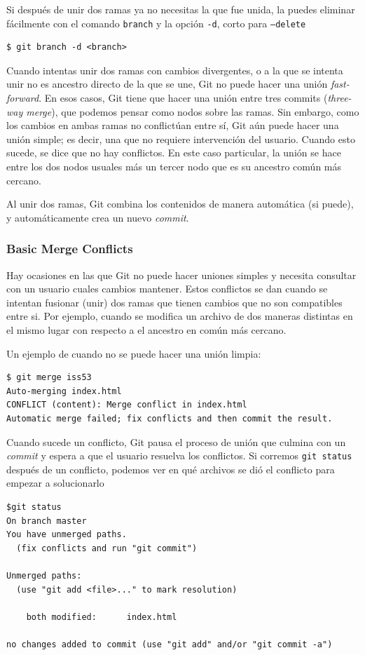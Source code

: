\documentclass[spanish, 12pt, a4paper]{article}
\begin{document}
Si después de unir dos ramas ya no necesitas la que fue unida, la puedes eliminar fácilmente con el comando \texttt{branch} y la opción \texttt{-d}, corto para \texttt{--delete}
\begin{lstlisting}
$ git branch -d <branch>
\end{lstlisting}

Cuando intentas unir dos ramas con cambios divergentes, o a la que se intenta unir no es ancestro directo de la que se une, Git no puede hacer una unión \textit{fast-forward}.
En esos casos, Git tiene que hacer una unión entre tres commits (\textit{three-way merge}), que podemos pensar como nodos sobre las ramas.
Sin embargo, como los cambios en ambas ramas no conflictúan entre sí, Git aún puede hacer una unión simple; es decir, una que no requiere intervención del usuario.
Cuando esto sucede, se dice que no hay conflictos.
En este caso particular, la unión se hace entre los dos nodos usuales más un tercer nodo que es su ancestro común más cercano.

Al unir dos ramas, Git combina los contenidos de manera automática (si puede), y automáticamente crea un nuevo \textit{commit}.

\subsubsection{Basic Merge Conflicts}
Hay ocasiones en las que Git no puede hacer uniones simples y necesita consultar con un usuario cuales cambios mantener.
Estos conflictos se dan cuando se intentan fusionar (unir) dos ramas que tienen cambios que no son compatibles entre si.
Por ejemplo, cuando se modifica un archivo de dos maneras distintas en el mismo lugar con respecto a el ancestro en común más cercano.

Un ejemplo de cuando no se puede hacer una unión limpia:
\begin{lstlisting}
$ git merge iss53
Auto-merging index.html
CONFLICT (content): Merge conflict in index.html
Automatic merge failed; fix conflicts and then commit the result.
\end{lstlisting}

Cuando sucede un conflicto, Git pausa el proceso de unión que culmina con un \textit{commit} y espera a que el usuario resuelva los conflictos.
Si corremos \texttt{git status} después de un conflicto, podemos ver en qué archivos se dió el conflicto para empezar a solucionarlo
\begin{lstlisting}
$git status
On branch master
You have unmerged paths.
  (fix conflicts and run "git commit")

Unmerged paths:
  (use "git add <file>..." to mark resolution)

    both modified:      index.html

no changes added to commit (use "git add" and/or "git commit -a")
\end{lstlisting}
\end{document}
